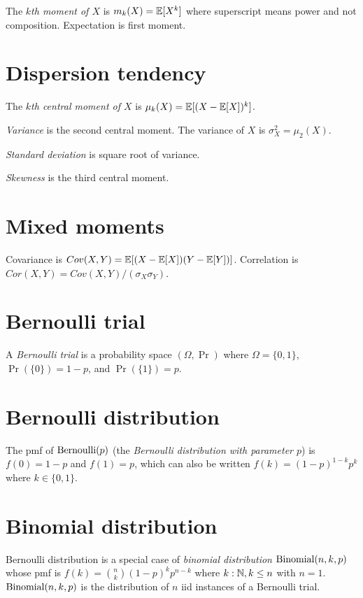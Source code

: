%
The \emph{\(k\)th moment of \(X\)} is \(m_k(X) = \Expect{X^k}\)
where superscript means power and not composition.
Expectation is first moment.

\section{Dispersion tendency}

%
The \emph{\(k\)th central moment of \(X\)} is \(\mu_k(X) = \Expect{(X - \Expect{X})^k}\).

%
\emph{Variance} is the second central moment.
The variance of \(X\) is \(\sigma_X^2 = \mu_2(X)\).

%
\emph{Standard deviation} is square root of variance.

%
\emph{Skewness} is the third central moment.

\section{Mixed moments}

Covariance is \(Cov(X,Y) = \Expect{(X-\Expect{X})(Y-\Expect{Y})}\).
Correlation is \(Cor(X,Y) = Cov(X,Y) / (\sigma_X \sigma_Y)\).

\section{Bernoulli trial}

%
A \emph{Bernoulli trial}
is a probability space \((\Omega,\Pr)\) where \(\Omega = \{0,1\}\),
\(\Pr(\{0\}) = 1 - p\), and \(\Pr(\{1\}) = p\).

\section{Bernoulli distribution}

%
%
The pmf of \(\Bernoulli(p)\) (the \emph{Bernoulli distribution with parameter \(p\)})
is \(f(0) = 1 - p\) and \(f(1) = p\),
which can also be written \(f(k) = (1-p)^{1-k} p^k\) where \(k \in \{0,1\}\).

\section{Binomial distribution}

Bernoulli distribution is a special case of
\emph{binomial distribution} \(\Binomial(n,k,p)\) whose pmf is
\(f(k) = \binom{n}{k} (1-p)^k p^{n-k}\) where \(k : \Nat, k \le n\) with \(n=1\).
\(\Binomial(n,k,p)\) is the distribution of \(n\) iid instances of a Bernoulli trial.

